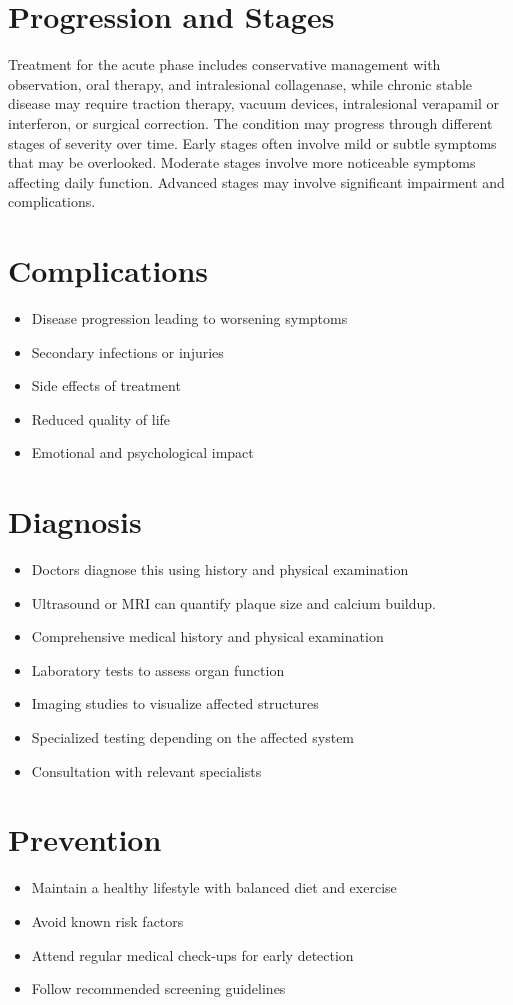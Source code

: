 \section{Progression and Stages}
Treatment for the acute phase includes conservative management with observation, oral therapy, and intralesional collagenase, while chronic stable disease may require traction therapy, vacuum devices, intralesional verapamil or interferon, or surgical correction. The condition may progress through different stages of severity over time. Early stages often involve mild or subtle symptoms that may be overlooked. Moderate stages involve more noticeable symptoms affecting daily function. Advanced stages may involve significant impairment and complications.
\section{Complications}
\begin{itemize}[noitemsep]
  \item Disease progression leading to worsening symptoms
  \item Secondary infections or injuries
  \item Side effects of treatment
  \item Reduced quality of life
  \item Emotional and psychological impact
\end{itemize}
\section{Diagnosis}
\begin{itemize}[noitemsep]
  \item Doctors diagnose this using history and physical examination
  \item Ultrasound or MRI can quantify plaque size and calcium buildup.
  \item Comprehensive medical history and physical examination
  \item Laboratory tests to assess organ function
  \item Imaging studies to visualize affected structures
  \item Specialized testing depending on the affected system
  \item Consultation with relevant specialists
\end{itemize}
\section{Prevention}
\begin{itemize}[noitemsep]
  \item Maintain a healthy lifestyle with balanced diet and exercise
  \item Avoid known risk factors
  \item Attend regular medical check-ups for early detection
  \item Follow recommended screening guidelines
\end{itemize}
